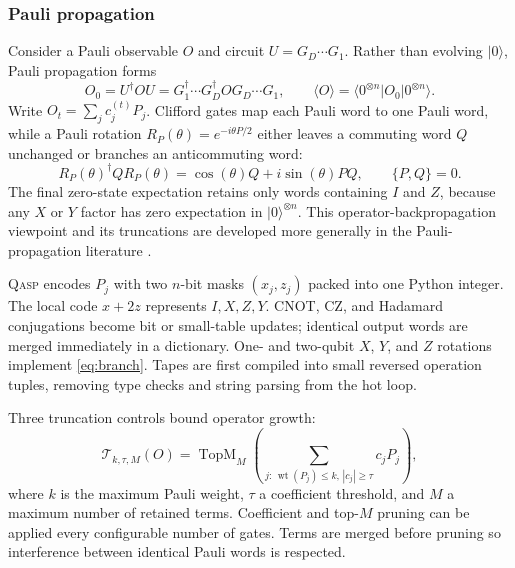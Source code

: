 \documentclass[10pt]{article}
\newcommand{\qasp}{\textsc{Qasp}}
\begin{document}
\subsubsection{Pauli propagation}

Consider a Pauli observable $O$ and circuit $U=G_D\cdots G_1$.  Rather than evolving $\lvert 0\rangle$, Pauli propagation forms
\begin{equation}
  O_0=U^{\dagger}OU
  =G_1^{\dagger}\cdots G_D^{\dagger}O G_D\cdots G_1,
  \qquad
  \langle O\rangle=\langle0^{\otimes n}\rvert O_0\lvert0^{\otimes n}\rangle.
  \label{eq:heisenberg}
\end{equation}
Write $O_t=\sum_j c_j^{(t)}P_j$.  Clifford gates map each Pauli word to one Pauli word, while a Pauli rotation $R_P(\theta)=e^{-i\theta P/2}$ either leaves a commuting word $Q$ unchanged or branches an anticommuting word:
\begin{equation}
  R_P(\theta)^{\dagger} Q R_P(\theta)
  =\cos(\theta)Q+i\sin(\theta)PQ,
  \qquad \{P,Q\}=0.
  \label{eq:branch}
\end{equation}
The final zero-state expectation retains only words containing $I$ and $Z$, because any $X$ or $Y$ factor has zero expectation in $\lvert0\rangle^{\otimes n}$.  This operator-backpropagation viewpoint and its truncations are developed more generally in the Pauli-propagation literature \cite{fontana2025lowesa,rudolph2025pauli}.

\qasp{} encodes $P_j$ with two $n$-bit masks $(x_j,z_j)$ packed into one Python integer.  The local code $x+2z$ represents $I,X,Z,Y$.  CNOT, CZ, and Hadamard conjugations become bit or small-table updates; identical output words are merged immediately in a dictionary.  One- and two-qubit $X$, $Y$, and $Z$ rotations implement \cref{eq:branch}.  Tapes are first compiled into small reversed operation tuples, removing type checks and string parsing from the hot loop.

Three truncation controls bound operator growth:
\begin{equation}
  \mathcal{T}_{k,\tau,M}(O)
  = \operatorname{TopM}_{M}\!\left(
    \sum_{j:\,\operatorname{wt}(P_j)\le k,\,|c_j|\ge\tau}c_jP_j
  \right),
  \label{eq:truncation}
\end{equation}
where $k$ is the maximum Pauli weight, $\tau$ a coefficient threshold, and $M$ a maximum number of retained terms.  Coefficient and top-$M$ pruning can be applied every configurable number of gates.  Terms are merged before pruning so interference between identical Pauli words is respected.
\end{document}
